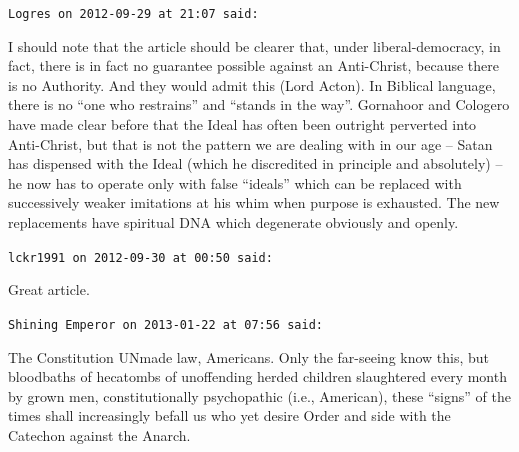 \begin{footnotesize}
\begin{sffamily}
\texttt{Logres on 2012-09-29 at 21:07 said:}

I should note that the article should be clearer that, under liberal-democracy, in fact, there is in fact no guarantee possible against an Anti-Christ, because there is no Authority. And they would admit this (Lord Acton). In Biblical language, there is no ``one who restrains'' and ``stands in the way''. Gornahoor and Cologero have made clear before that the Ideal has often been outright perverted into Anti-Christ, but that is not the pattern we are dealing with in our age -- Satan has dispensed with the Ideal (which he discredited in principle and absolutely) -- he now has to operate only with false ``ideals'' which can be replaced with successively weaker imitations at his whim when purpose is exhausted. The new replacements have spiritual DNA which degenerate obviously and openly.

\hfill

\texttt{lckr1991 on 2012-09-30 at 00:50 said:}

Great article.

\hfill

\texttt{Shining Emperor on 2013-01-22 at 07:56 said:}

The Constitution UNmade law, Americans. Only the far-seeing know this, but bloodbaths of hecatombs of unoffending herded children slaughtered every month by grown men, constitutionally psychopathic (i.e., American), these ``signs'' of the times shall increasingly befall us who yet desire Order and side with the Catechon against the Anarch.


\hfill

\end{sffamily}
\end{footnotesize}

